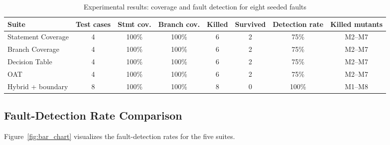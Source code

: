 \documentclass[conference]{IEEEtran}
\begin{document}
\begin{table}[!t]

\centering

\caption{Experimental results: coverage and fault detection for eight seeded faults}

\label{tab:exp_results}

\begin{tabular}{|l|c|c|c|c|c|c|c|}
\hline
\textbf{Suite} & \textbf{Test cases} & \textbf{Stmt cov.} & \textbf{Branch cov.} & \textbf{Killed} & \textbf{Survived} & \textbf{Detection rate} & \textbf{Killed mutants} \\
\hline
Statement Coverage & 4 & 100\% & 100\% & 6 & 2 & 75\% & M2--M7 \\
Branch Coverage    & 4 & 100\% & 100\% & 6 & 2 & 75\% & M2--M7 \\
Decision Table     & 4 & 100\% & 100\% & 6 & 2 & 75\% & M2--M7 \\
OAT                & 4 & 100\% & 100\% & 6 & 2 & 75\% & M2--M7 \\
Hybrid + boundary  & 8 & 100\% & 100\% & 8 & 0 & 100\% & M1--M8 \\
\hline
\end{tabular}

\end{table}



\subsection{Fault-Detection Rate Comparison}

Figure~\ref{fig:bar_chart} visualizes the fault-detection rates for the five suites.
\end{document}
